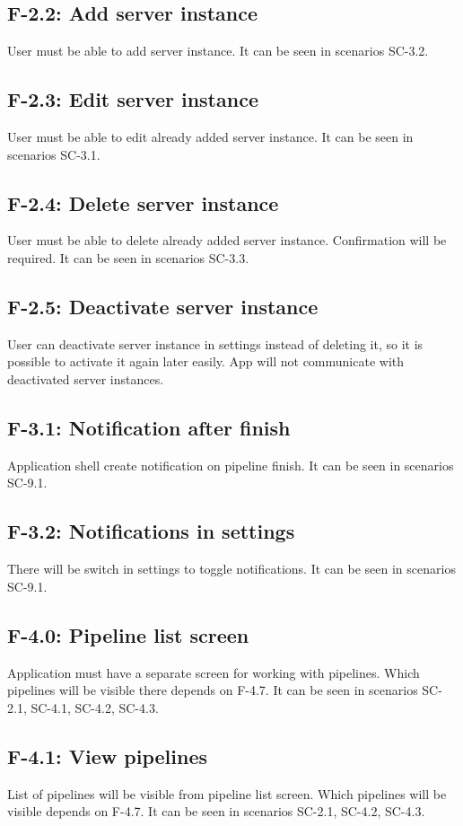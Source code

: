 \subsection*{F-2.2: Add server instance}
User must be able to add server instance. It can be seen in scenarios SC-3.2.
\subsection*{F-2.3: Edit server instance}
User must be able to edit already added server instance. It can be seen in scenarios SC-3.1.
\subsection*{F-2.4: Delete server instance}
User must be able to delete already added server instance. Confirmation will be required. It can be seen in scenarios SC-3.3.
\subsection*{F-2.5: Deactivate server instance}
User can deactivate server instance in settings instead of deleting it, so it is possible to activate it again later easily. App will not communicate with deactivated server instances.
\subsection*{F-3.1: Notification after finish}
Application shell create notification on pipeline finish. It can be seen in scenarios SC-9.1.
\subsection*{F-3.2: Notifications in settings}
There will be switch in settings to toggle notifications. It can be seen in scenarios SC-9.1.
\subsection*{F-4.0: Pipeline list screen}
Application must have a separate screen for working with pipelines. Which pipelines will be visible there depends on F-4.7. It can be seen in scenarios SC-2.1, SC-4.1, SC-4.2, SC-4.3.
\subsection*{F-4.1: View pipelines}
List of pipelines will be visible from pipeline list screen. Which pipelines will be visible depends on F-4.7. It can be seen in scenarios SC-2.1, SC-4.2, SC-4.3.

